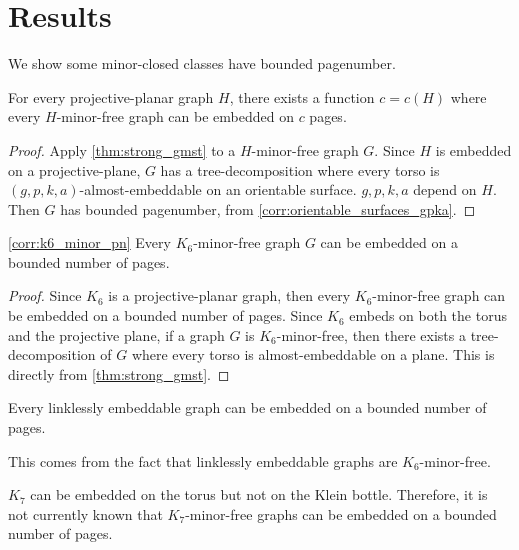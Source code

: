 \section{Results}
We show some minor-closed classes have bounded pagenumber.

\begin{proposition}
	For every projective-planar graph $H$, there exists a function $c = c(H)$ where every $H$-minor-free graph can be embedded on $c$ pages. 
\end{proposition}
\begin{proof}
	Apply \cref{thm:strong_gmst} to a $H$-minor-free graph $G$. Since $H$ is embedded on a projective-plane, $G$ has a tree-decomposition where every torso is $(g,p,k,a)$-almost-embeddable on an orientable surface. $g, p, k,a$ depend on $H$. Then $G$ has bounded pagenumber, from \cref{corr:orientable_surfaces_gpka}.
\end{proof}

\begin{corollary}\cref{corr:k6_minor_pn}
	Every $K_6$-minor-free graph $G$ can be embedded on a bounded number of pages.
\end{corollary}

\begin{proof}
	Since $K_6$ is a projective-planar graph, then every $K_6$-minor-free graph can be embedded on a bounded number of pages. Since $K_6$ embeds on both the torus and the projective plane, if a graph $G$ is $K_6$-minor-free, then there exists a tree-decomposition of $G$ where every torso is almost-embeddable on a plane. This is directly from \cref{thm:strong_gmst}. 
\end{proof}
\begin{corollary}
    Every linklessly embeddable graph can be embedded on a bounded number of pages.
\end{corollary}
This comes from the fact that linklessly embeddable graphs are $K_6$-minor-free.

$K_7$ can be embedded on the torus but not on the Klein bottle. Therefore, it is not currently known that $K_7$-minor-free graphs can be embedded on a bounded number of pages. 

